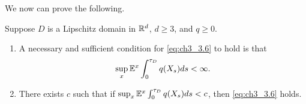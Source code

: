 We now can prove the following.

\begin{theorem}\label{thm:ch3_3.7}
Suppose $D$ is a Lipschitz domain in $\mathbb{R}^d$, $d \geq 3$, and $q \geq 0$.
\begin{enumerate}[wide, labelindent=0em, labelwidth=\parindent, labelsep = 0em]
    \item A necessary and sufficient condition for \eqref{eq:ch3_3.6} to hold is that
        \begin{equation}\label{eq:ch3_3.13}
            \sup_x \mathbb{E}^x \int_0^{\tau_D} q(X_s)ds < \infty.
        \end{equation}
    \item There exists $c$ such that if $\sup_x \mathbb{E}^x \int_0^{\tau_D} q(X_s)ds < c$, then \eqref{eq:ch3_3.6} holds.
\end{enumerate}
\end{theorem}

